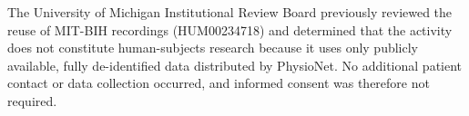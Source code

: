 The University of Michigan Institutional Review Board previously reviewed the reuse of MIT-BIH recordings (HUM00234718) and determined that the activity does not constitute human-subjects research because it uses only publicly available, fully de-identified data distributed by PhysioNet. No additional patient contact or data collection occurred, and informed consent was therefore not required.
